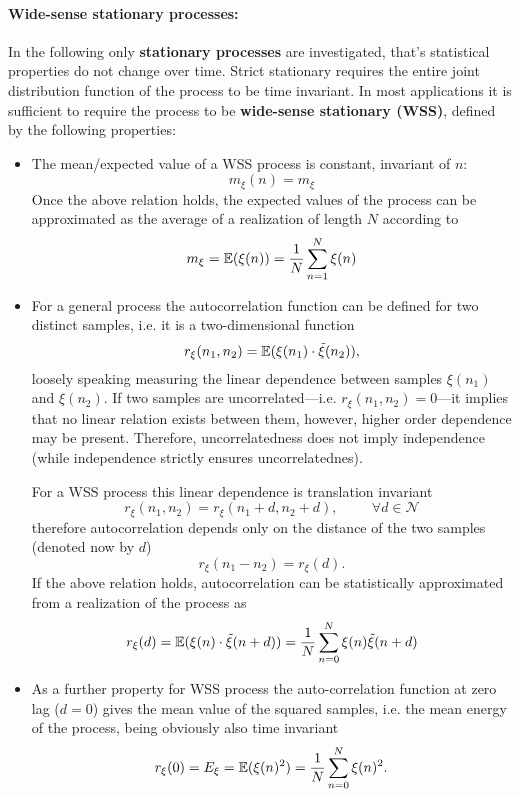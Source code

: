 \paragraph*{Wide-sense stationary processes:}
In the following only \textbf{stationary processes} are investigated, that's statistical properties do not change over time.
Strict stationary requires the entire joint distribution function of the process to be time invariant.
In most applications it is sufficient to require the process to be \textbf{wide-sense stationary (WSS)}, defined by the following properties:
\begin{itemize}
\item The mean/expected value of a WSS process is constant, invariant of $n$:
\begin{equation}
m_\xi(n) = m_\xi
\end{equation}
Once the above relation holds, the expected values of the process can be approximated as the average of a realization of length $N$ according to
\begin{equation}
m_\xi = \operatorname{\mathbb{E}}(\xi(n) ) = \frac{1}{N} \sum_{n = 1}^{N} \xi(n)
\end{equation}
\item For a general process the autocorrelation function can be defined for two distinct samples, i.e. it is a two-dimensional function 
\begin{equation}
r_\xi(n_1,n_2) = \operatorname{\mathbb{E}}( \xi(n_1) \cdot \tilde{\xi}(n_2) ),
\end{equation}
loosely speaking measuring the linear dependence between samples $\xi(n_1)$ and $\xi(n_2)$.
If two samples are uncorrelated---i.e. $r_\xi(n_1,n_2)=0$---it implies that no linear relation exists between them, however, higher order dependence may be present.
Therefore, uncorrelatedness does not imply independence (while independence strictly ensures uncorrelatednes).

For a WSS process this linear dependence is translation invariant
\begin{equation}
r_\xi(n_1,n_2) = r_\xi(n_1+ d , n_2 + d), \hspace{1cm} \forall d \in \mathcal{N}
\end{equation}
therefore autocorrelation depends only on the distance of the two samples (denoted now by $d$)
\begin{equation}
r_\xi(n_1 - n_2) = r_\xi(d).
\end{equation}
If the above relation holds, autocorrelation can be statistically approximated from a realization of the process as
\begin{equation}
r_\xi(d) = \operatorname{\mathbb{E}}( \xi(n) \cdot \tilde{\xi}(n + d) ) = \frac{1}{N} \sum_{n = 0}^N \xi(n)\tilde{\xi}(n+ d)
\end{equation}
\item As a further property for WSS process the auto-correlation function at zero lag ($d=0$) gives the mean value of the squared samples, i.e. the mean energy of the process, being obviously also time invariant
\begin{equation}
r_\xi(0) = E_\xi =  \operatorname{\mathbb{E}}( \xi(n)^2 ) = \frac{1}{N} \sum_{n = 0}^N \xi(n)^2.
\end{equation}
\end{itemize}

